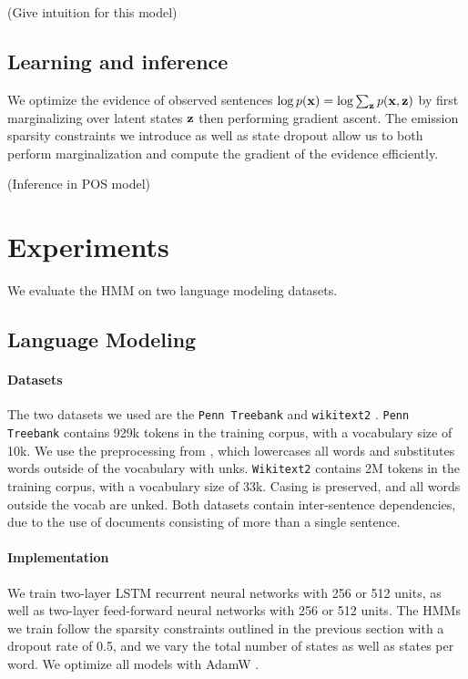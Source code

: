 \documentclass[11pt,a4paper]{article}
\begin{document}
(Give intuition for this model)

\subsection{Learning and inference}
We optimize the evidence of observed sentences $\log p(\mathbf{x}) = \log \sum_{\mathbf{z}} p(\mathbf{x},\mathbf{z})$
by first marginalizing over latent states $\mathbf{z}$ then performing gradient ascent.
The emission sparsity constraints we introduce as well as state dropout
allow us to both perform marginalization
and compute the gradient of the evidence efficiently.

(Inference in POS model)

\section{Experiments}
We evaluate the HMM on two language modeling datasets.

\subsection{Language Modeling}
\paragraph{Datasets}
The two datasets we used are the \texttt{Penn Treebank} \citep{ptb}
and \texttt{wikitext2} \citep{wikitext}.
\texttt{Penn Treebank} contains 929k tokens in the training corpus,
with a vocabulary size of 10k.
We use the preprocessing from \citet{mikolov-2011},
which lowercases all words and substitutes words outside of the vocabulary
with unks. 
\texttt{Wikitext2} contains 2M tokens in the training corpus,
with a vocabulary size of 33k.
Casing is preserved, and all words outside the vocab are unked.
Both datasets contain inter-sentence dependencies,
due to the use of documents consisting of more than a single sentence.

\paragraph{Implementation}
We train two-layer LSTM recurrent neural networks with 256 or 512 units,
as well as two-layer feed-forward neural networks with 256 or 512 units.
The HMMs we train follow the sparsity constraints outlined in the previous
section with a dropout rate of 0.5,
and we vary the total number of states as well as states per word.
We optimize all models with AdamW \citep{adamw}.
\end{document}
